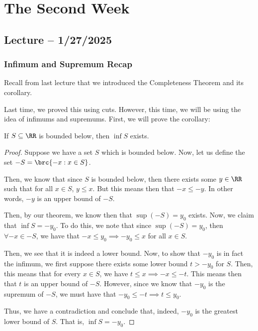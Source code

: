 \documentclass[openany]{book}
\begin{document}
\chapter{The Second Week}
\section{Lecture -- 1/27/2025}
\subsection{Infimum and Supremum Recap}
Recall from last lecture that we introduced the Completeness Theorem and its corollary.

Last time, we proved this using cuts. However, this time, we will be using the idea of infimums and supremums. First, we will prove the corollary:
\begin{cor}
	If $S \subseteq \RR$ is bounded below, then $\inf S$ exists.
\end{cor}
\begin{proof}
	Suppose we have a set $S$ which is bounded below. Now, let us define the set $-S = \brc{-x : x \in S}$.
	
	Then, we know that since $S$ is bounded below, then there exists some $y \in \RR$ such that for all $x \in S$, $y \leq x$. But this means then that $-x \leq -y$. In other words, $-y$ is an upper bound of $-S$.
	
	Then, by our theorem, we know then that $\sup (-S) = y_0$ exists. Now, we claim that $\inf S = -y_0$. To do this, we note that since $\sup (-S) = y_0$, then $\forall -x \in -S$, we have that $-x \leq y_0 \implies -y_0 \leq x$ for all $x \in S$.
	
	Then, we see that it is indeed a lower bound. Now, to show that $-y_0$ is in fact the infimum, we first suppose there exists some lower bound $t > -y_0$ for $S$. Then, this means that for every $x \in S$, we have $t \leq x \implies -x \leq -t$. This means then that $t$ is an upper bound of $-S$. However, since we know that $-y_0$ is the supremum of $-S$, we must have that $-y_0 \leq -t \implies t \leq y_0$.
	
	Thus, we have a contradiction and conclude that, indeed, $-y_0$ is the greatest lower bound of $S$. That is, $\inf S = -y_0$.
\end{proof}
\end{document}
